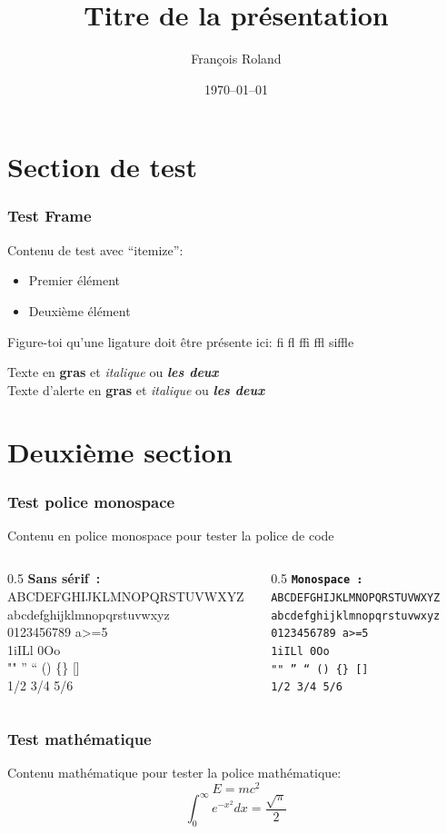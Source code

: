 
\title{Titre de la présentation}
\author{François Roland}
\date{1970--01--01}



\begin{frame}
  \titlepage{}
\end{frame}

\section{Section de test}

\begin{frame}
  \frametitle{Test Frame}
  Contenu de test avec \enquote{itemize}:
  \begin{itemize}
    \item Premier élément
    \item Deuxième élément
  \end{itemize}

  Figure-toi qu'une ligature doit être présente ici: fi fl ffi ffl siffle

  Texte en \textbf{gras} et \textit{italique} ou \textbf{\textit{les deux}}\\
  \alert{Texte d'alerte en \textbf{gras} et \textit{italique} ou \textbf{\textit{les deux}}}
\end{frame}

\section{Deuxième section}

\begin{frame}[fragile]
  \frametitle{Test police monospace}
  Contenu en police monospace pour tester la police de code

  \vfill{}

  \begin{columns}
    \begin{column}{0.5\textwidth}
      \textbf{Sans sérif~:}
      ABCDEFGHIJKLMNOPQRSTUVWXYZ \\
      abcdefghijklmnopqrstuvwxyz \\
      0123456789 a>=5\\
      1iILl 0Oo \\
      "" '' `` () \{\} [] \\
      1/2 3/4 5/6
    \end{column}
    \begin{column}{0.5\textwidth}
      \texttt{\textbf{Monospace~:}}
      \texttt{ABCDEFGHIJKLMNOPQRSTUVWXYZ}\\
      \texttt{abcdefghijklmnopqrstuvwxyz}\\
      \texttt{0123456789 a>=5}\\
      \texttt{1iILl 0Oo}\\
      \texttt{"" '' `` () \{\} []}\\
      \texttt{1/2 3/4 5/6}
    \end{column}
  \end{columns}
\end{frame}

\begin{frame}
  \frametitle{Test mathématique}
  Contenu mathématique pour tester la police mathématique:
  \[
    E = mc^2
  \]
  \[
    \int_0^\infty e^{-x^2} dx = \frac{\sqrt{\pi}}{2}
  \]
\end{frame}


